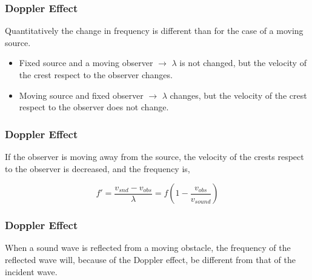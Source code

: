 \documentclass[]{beamer}
\begin{document}

\begin{frame}
\frametitle{Doppler Effect}





Quantitatively the change in frequency is different
than for the case of a moving source. 

\pause
\vspace{3mm}

\begin{itemize}
\item Fixed source and a moving observer $\rightarrow$ $\lambda$ is not changed, but the velocity of the crest respect to the observer changes.
\item Moving source and fixed observer  $\rightarrow$ $\lambda$ changes, but the velocity of the crest respect to the observer does not change. 
\end{itemize}

  \end{frame}





\begin{frame}
\frametitle{Doppler Effect}



If the observer is moving away from the source, the velocity of the crests respect to the observer is decreased, and the frequency is,


\begin{equation}
f'=\frac{v_{snd}-v_{obs}}{\lambda}=f\left(1-\frac{v_{obs}}{v_{sound}}\right)
\end{equation}

  \end{frame}










\begin{frame}
\frametitle{Doppler Effect}


When a sound wave is reflected from a moving obstacle, the frequency of the
reflected wave will, because of the Doppler effect, be different from that of
the incident wave.



  \end{frame}
\end{document}
